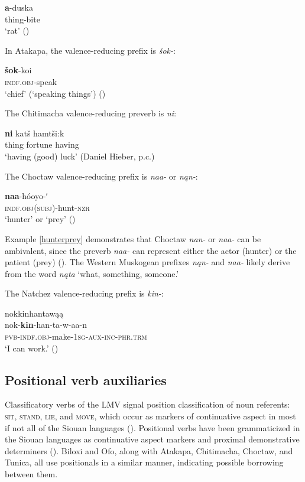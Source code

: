 \documentclass[output=paper]{LSP/langsci}
\begin{document}
\ea
\gll	\textbf{a}-duska\\
		thing-bite\\
\glt	 `rat' (\citealt[186]{DorseySwanton1912})
\z

	In Atakapa, the valence-reducing prefix is \emph{šok-}:

\ea
\gll	\textbf{šok}-koi\\
		\textsc{indf.obj}-speak \\

\glt	`chief' (`speaking things') (\citealt[9]{GatschetSwanton1932})
\z

The Chitimacha valence-reducing preverb is \emph{ni}:

\ea
\gll	\textbf{ni} 	katš hamtši:k \\
	thing fortune having\\

\glt `having (good) luck' (Daniel Hieber, p.c.)
\z

	The Choctaw valence-reducing prefix is \emph{naa-} or \emph{nąn-}:
	
\ea\label{hunterprey}
\gll	\textbf{naa}-hóoyo-ʹ~\\
		\textsc{indf.obj(subj)}-hunt-\textsc{nzr}\\
\glt	`hunter' or `prey' (\citealt[53]{Broadwell2006})
\z

Example \ref{hunterprey} demonstrates that Choctaw \emph{nan-} or \emph{naa-} can be ambivalent, since the preverb \emph{naa-} can represent either the actor (hunter) or the patient (prey) (\citealt[53]{Broadwell2006}). The Western Muskogean prefixes \emph{nąn-} and \emph{naa-} likely derive from the word \emph{nąta} `what, something, someone.'
 
	The Natchez valence-reducing prefix is \emph{kin-}:
	
\ea	nokkinhantawąą\\
\gll		nok-\textbf{kin}-han-ta-w-aa-n\\
		\textsc{pvb-indf.obj}-make-\textsc{1sg-aux-inc-phr.trm}\\
\glt	`I can work.' (\citealt[405]{Kimball2005})
\z

\subsection{Positional verb auxiliaries}

Classificatory verbs of the LMV signal position classification of noun referents: \textsc{sit}, \textsc{stand}, \textsc{lie}, and \textsc{move}, which occur as markers of continuative aspect in most if not all of the Siouan languages (\citealt[203]{Rankin2004positionals}). Positional verbs have been grammaticized in the Siouan languages as continuative aspect markers and proximal demonstrative determiners (\citealt[116]{Mithun1999}). Biloxi and Ofo, along with Atakapa, Chitimacha, Choctaw, and Tunica, all use positionals in a similar manner, indicating possible borrowing between them. 
\end{document}
